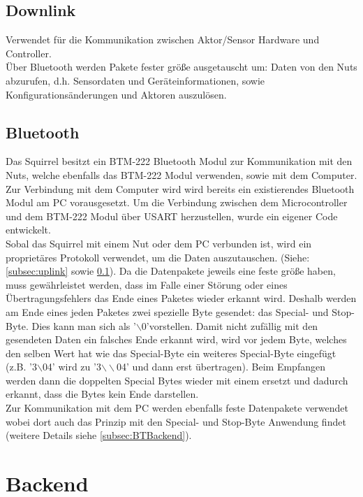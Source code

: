 \documentclass[12pt,a4paper]{article}
\begin{document}
\subsection{Downlink}
\label{subsec:downlink}

Verwendet für die Kommunikation zwischen Aktor/Sensor Hardware und Controller.\\
Über Bluetooth werden Pakete fester größe ausgetauscht um: Daten von den Nuts abzurufen, d.h. Sensordaten und Geräteinformationen, sowie Konfigurationsänderungen und Aktoren auszulösen. 

\subsection{Bluetooth}
Das Squirrel besitzt ein BTM-222 Bluetooth Modul zur Kommunikation mit den Nuts, welche ebenfalls das BTM-222 Modul verwenden, sowie mit dem Computer. Zur Verbindung mit dem Computer wird wird bereits ein existierendes Bluetooth Modul am PC vorausgesetzt. 
Um die Verbindung zwischen dem Microcontroller und dem BTM-222 Modul über USART herzustellen, wurde ein eigener Code entwickelt.\\
Sobal das Squirrel mit einem Nut oder dem PC verbunden ist, wird ein proprietäres Protokoll verwendet, um die Daten auszutauschen. (Siehe: \ref{subsec:uplink} sowie \ref{subsec:downlink}). Da die Datenpakete jeweils eine feste größe haben, muss gewährleistet werden, dass im Falle einer Störung oder eines Übertragungsfehlers das Ende eines Paketes wieder erkannt wird. Deshalb werden am Ende eines jeden Paketes zwei spezielle Byte gesendet: das Special- und Stop-Byte. Dies kann man sich als '$\backslash$0'vorstellen. Damit nicht zufällig mit den gesendeten Daten ein falsches Ende erkannt wird, wird vor jedem Byte, welches den selben Wert hat wie das Special-Byte ein weiteres Special-Byte eingefügt (z.B. '3$\backslash$04' wird zu '3$\backslash\backslash$04' und dann erst übertragen). Beim Empfangen werden dann die doppelten Special Bytes wieder mit einem ersetzt und dadurch erkannt, dass die Bytes kein Ende darstellen.\\
Zur Kommunikation mit dem PC werden ebenfalls feste Datenpakete verwendet wobei dort auch das Prinzip mit den Special- und Stop-Byte Anwendung findet (weitere Details siehe \ref{subsec:BTBackend}).

\section{Backend}
\end{document}
